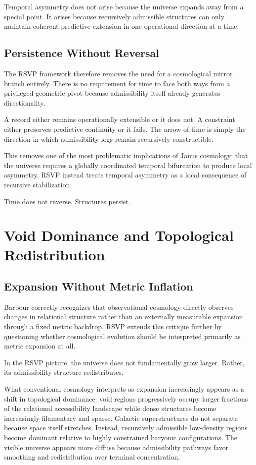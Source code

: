 \documentclass[12pt, a4paper]{article}
\begin{document}
Temporal asymmetry does not arise because the universe expands away from a
special point. It arises because recursively admissible structures can only
maintain coherent predictive extension in one operational direction at a
time.

\subsection{Persistence Without Reversal}

The RSVP framework therefore removes the need for a cosmological mirror
branch entirely. There is no requirement for time to face both ways from a
privileged geometric pivot because admissibility itself already generates
directionality.

A record either remains operationally extensible or it does not. A
constraint either preserves predictive continuity or it fails. The arrow of
time is simply the direction in which admissibility logs remain recursively
constructible.

This removes one of the most problematic implications of Janus cosmology:
that the universe requires a globally coordinated temporal bifurcation to
produce local asymmetry. RSVP instead treats temporal asymmetry as a local
consequence of recursive stabilization.

Time does not reverse. Structures persist.

\section{Void Dominance and Topological Redistribution}

\subsection{Expansion Without Metric Inflation}

Barbour correctly recognizes that observational cosmology directly observes
changes in relational structure rather than an externally measurable
expansion through a fixed metric backdrop. RSVP extends this critique
further by questioning whether cosmological evolution should be interpreted
primarily as metric expansion at all.

In the RSVP picture, the universe does not fundamentally grow larger.
Rather, its admissibility structure redistributes.

What conventional cosmology interprets as expansion increasingly appears as
a shift in topological dominance: void regions progressively occupy larger
fractions of the relational accessibility landscape while dense structures
become increasingly filamentary and sparse. Galactic superstructures do not
separate because space itself stretches. Instead, recursively admissible
low-density regions become dominant relative to highly constrained baryonic
configurations. The visible universe appears more diffuse because
admissibility pathways favor smoothing and redistribution over terminal
concentration.
\end{document}
